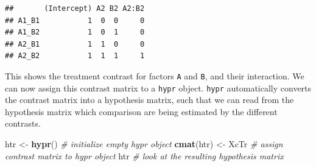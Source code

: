 \documentclass[12pt,]{krantz}
\newenvironment{Shaded}{\begin{snugshade}}{\end{snugshade}}
\newcommand{\KeywordTok}[1]{\textcolor[rgb]{0.13,0.29,0.53}{\textbf{#1}}}
\newcommand{\DecValTok}[1]{\textcolor[rgb]{0.00,0.00,0.81}{#1}}
\newcommand{\StringTok}[1]{\textcolor[rgb]{0.31,0.60,0.02}{#1}}
\newcommand{\CommentTok}[1]{\textcolor[rgb]{0.56,0.35,0.01}{\textit{#1}}}
\newcommand{\OperatorTok}[1]{\textcolor[rgb]{0.81,0.36,0.00}{\textbf{#1}}}
\newcommand{\NormalTok}[1]{#1}
\theoremstyle{definition}
\theoremstyle{definition}
\theoremstyle{definition}
\theoremstyle{remark}
\begin{document}
\begin{Shaded}
\end{Shaded}

\begin{verbatim}
##       (Intercept) A2 B2 A2:B2
## A1_B1           1  0  0     0
## A1_B2           1  0  1     0
## A2_B1           1  1  0     0
## A2_B2           1  1  1     1
\end{verbatim}

This shows the treatment contrast for factors \texttt{A} and \texttt{B},
and their interaction. We can now assign this contrast matrix to a
\texttt{hypr} object. \texttt{hypr} automatically converts the contrast
matrix into a hypothesis matrix, such that we can read from the
hypothesis matrix which comparison are being estimated by the different
contrasts.

\begin{Shaded}
\begin{Highlighting}[]
\NormalTok{htr <-}\StringTok{ }\KeywordTok{hypr}\NormalTok{() }\CommentTok{# initialize empty hypr object}
\KeywordTok{cmat}\NormalTok{(htr) <-}\StringTok{ }\NormalTok{XcTr }\CommentTok{# assign contrast matrix to hypr object}
\NormalTok{htr }\CommentTok{# look at the resulting hypothesis matrix}
\end{Highlighting}
\end{Shaded}
\end{document}
